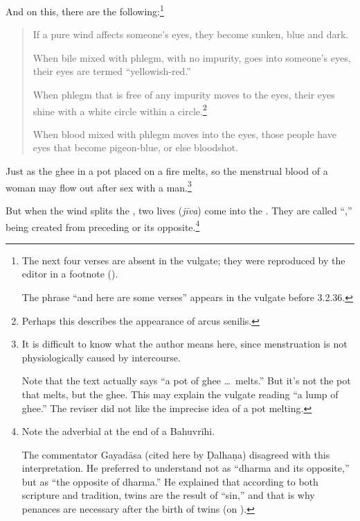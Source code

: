 \begin{translation}


\item[35.1--4]

And on this, there are the following:\footnote{The next four verses are 
absent in the vulgate; they were reproduced by the 
editor in a footnote (\cite[348a, n.\,3]{vulgate}).

The phrase “and here are some verses” appears 
in the vulgate before 3.2.36.}

\begin{quote}
If a pure wind affects someone's eyes, they become
sunken, blue and dark.

    
When bile mixed with phlegm, with no impurity, goes into
someone's eyes, their eyes are termed “yellowish-red.”
    
When phlegm that is free of any impurity moves to the eyes, their
eyes shine with a white circle within a circle.\footnote{Perhaps this
    describes the appearance of arcus senilis.}
    
When blood mixed with phlegm moves into the eyes, those people
have eyes that become pigeon-blue, or else bloodshot.
  
    \end{quote}

\item [36]

Just as the ghee in a pot placed on a fire melts, so the menstrual
blood of a woman may flow out after sex with a man.\footnote{It is
    difficult to know what the author means here, since menstruation is
    not physiologically caused by intercourse.
    
Note that the text actually says “a pot of ghee \ldots\ melts.”  But it's
not the pot that melts, but the ghee.  This may explain the vulgate
reading  “a lump of ghee.”  The reviser did not like
the imprecise idea of a pot melting.}

\item [37]

But when the wind splits the , two lives 
(\emph{jīva}) come into the .
They are called “,” being created from preceding
 or its opposite.\footnote{Note the adverbial 
 at the end of a Bahuvrīhi.  

The commentator Gayadāsa (cited here by Ḍalhaṇa) disagreed with this
interpretation.  He preferred to understand  not as
“dharma and its opposite,” but as “the opposite of dharma.” He
explained that according to both scripture and tradition, twins are
the result of  “sin,” and that is why penances are
necessary after the birth of twins (on ).

}
\end{translation}
